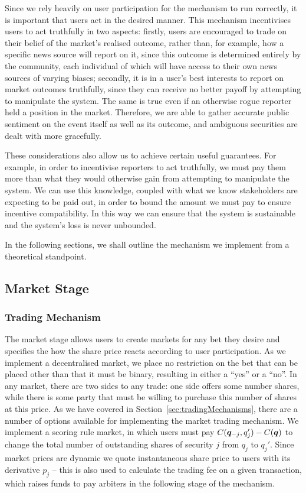 Since we rely heavily on user participation for the mechanism to run correctly,
it is important that users act in the desired manner. This mechanism
incentivises users to act truthfully in two aspects: firstly, users are
encouraged to trade on their belief of the market's realised outcome, rather
than, for example, how a specific news source will report on it, since this
outcome is determined entirely by the community, each individual of which will
have access to their own news sources of varying biases; secondly, it is in a
user's best interests to report on market outcomes truthfully, since they can
receive no better payoff by attempting to manipulate the system. The same is
true even if an otherwise rogue reporter held a position in the market.
Therefore, we are able to gather accurate public sentiment on the event itself
as well as its outcome, and ambiguous securities are dealt with more gracefully.

These considerations also allow us to achieve certain useful guarantees. For
example, in order to incentivise reporters to act truthfully, we must pay them
more than what they would otherwise gain from attempting to manipulate the
system. We can use this knowledge, coupled with what we know stakeholders are
expecting to be paid out, in order to bound the amount we must pay to
ensure incentive compatibility. In this way we can ensure that the system is
sustainable and the system's loss is never unbounded.

In the following sections, we shall outline the mechanism we implement from a
theoretical standpoint. 

\subsection{Market Stage}

\label{sec:marketStage}

\subsubsection{Trading Mechanism}

The market stage allows users to create markets for any bet they desire and
specifies the how the share price reacts according to user participation. As we
implement a decentralised market, we place no restriction on the bet that can
be placed other than that it must be binary, resulting in either a ``yes'' or a
``no''. In any market, there are two sides to any trade: one side offers some
number shares, while there is some party that must be willing to purchase this
number of shares at this price. As we have covered in
Section~\ref{sec:tradingMechanisms}, there are a number of options available
for implementing the market trading mechanism. We implement a scoring rule
market, in which users must pay $C(\bm{q}_{-j}, q_j')-C(\bm{q})$ to change
the total number of outstanding shares of security $j$ from $q_j$ to $q_j'$.
Since market prices are dynamic we quote instantaneous share price to users
with its derivative $p_j$ -- this is also used to calculate the trading fee on
a given transaction, which raises funds to pay arbiters in the following stage
of the mechanism.

